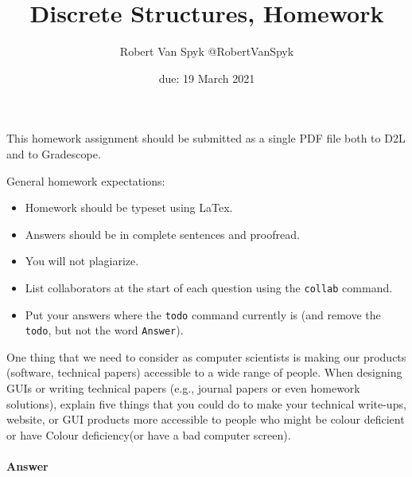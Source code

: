 \documentclass{article}
\title{Discrete Structures, Homework \hwnum}
\author{{Robert Van Spyk} @RobertVanSpyk }
\date{due: 19 March 2021}
\begin{document}
\maketitle

This homework assignment should be
submitted as a single PDF file both to D2L and to Gradescope.

General homework expectations:
\begin{itemize}
    \item Homework should be typeset using LaTex.
    \item Answers should be in complete sentences and proofread.
    \item You will not plagiarize.
    \item List collaborators at the start of each question using the \texttt{collab} command.
    \item Put your answers where the \texttt{todo} command currently is (and
        remove the \texttt{todo}, but not the word \texttt{Answer}).
\end{itemize}


 

One thing that we need to consider as computer scientists is making our products
(software, technical papers) accessible to a wide range of people. When
designing GUIs or writing technical papers (e.g., journal papers or even
homework solutions), explain five things that you could do to make your
technical write-ups, website, or GUI products more accessible to people who
might be colour deficient or have Colour deficiency(or have a bad computer screen).


\paragraph{Answer}
\end{document}
